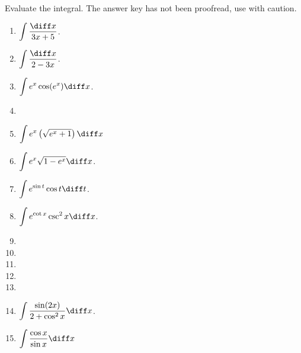 Evaluate the integral. The answer key has not been proofread, use with caution.
\begin{multicols}{3}
\begin{enumerate}[ref={\fcProblemRef}]
\item $\displaystyle\int \frac{\diff x}{3x+5} $.


\item $\displaystyle\int \frac{\diff x}{2-3x}$.

\item $\displaystyle\int e^x\cos (e^x) \diff x$.

\item 
\item \label{probleminte^x(sqrt(e^x+1))dx} ${\displaystyle \int e^x \left(\sqrt{e^x + 1}\right) \diff x}$

\item $\displaystyle\int e^x\sqrt{1-e^x} \diff x$.

\item $\displaystyle\int e^{\sin t }\cos t \diff t$.

\item $\displaystyle\int e^{\cot x}\csc^2x \diff x$.

\item 
\item 
\item 
\item 
\item 
\item \label{problemintsin(2x)/(2+cos^2x)dx} $\displaystyle\int \frac{\sin (2x)}{2+\cos^2x}\diff x$.

\item ${\displaystyle \int \frac{\cos x}{\sin x} \diff x}$


\end{enumerate}
\end{multicols}
